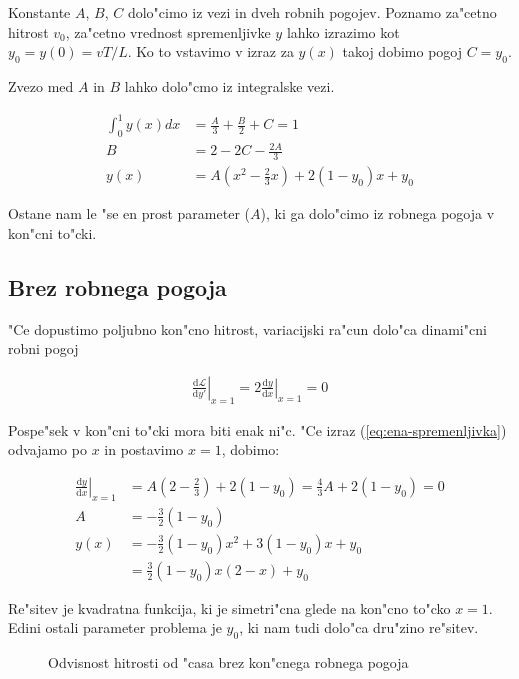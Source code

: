 \documentclass[12pt]{article}
\newcommand{\dd}{\mathrm{d}}
\begin{document}
Konstante $A$, $B$, $C$ dolo"cimo iz vezi in dveh robnih pogojev. Poznamo za"cetno hitrost $v_0$, za"cetno vrednost spremenljivke $y$ lahko izrazimo kot $y_0 = y(0) = v T / L$. Ko to vstavimo v izraz za $y(x)$ takoj dobimo pogoj $C = y_0$. 

Zvezo med $A$ in $B$ lahko dolo"cmo iz integralske vezi. 

\begin{align}
\int_0^1 y(x) dx &= \frac{A}{3} + \frac{B}{2} + C = 1 \\
B &= 2 - 2C - \frac{2A}{3} \\
y(x) &= A(x^2 - \frac{2}{3}x) + 2(1-y_0)x + y_0 \label{eq:ena-spremenljivka}
\end{align}

Ostane nam le "se en prost parameter ($A$), ki ga dolo"cimo iz robnega pogoja v kon"cni to"cki. 

\subsection{Brez robnega pogoja}
"Ce dopustimo poljubno kon"cno hitrost, variacijski ra"cun dolo"ca dinami"cni robni pogoj 

\begin{align}
\left.\frac{\dd \mathcal L}{\dd y'}\right|_{x=1} = 2\left.\frac{\dd y}{\dd x}\right|_{x=1} = 0 
\end{align}

Pospe"sek v kon"cni to"cki mora biti enak ni"c. "Ce izraz (\ref{eq:ena-spremenljivka}) odvajamo po $x$ in postavimo $x=1$, dobimo:

\begin{align}
\left.\frac{\dd y}{\dd x}\right|_{x=1} &= A(2 - \frac{2}{3}) + 2(1-y_0) = \frac{4}{3}A + 2(1-y_0) = 0 \\
A &= -\frac{3}{2}(1-y_0) \\
y(x) &=  -\frac{3}{2}(1-y_0)x^2 + 3(1-y_0)x + y_0 \\
  &= \frac{3}{2}(1-y_0) x (2-x) + y_0 \label{eq:brez-robnega}
\end{align}

Re"sitev je kvadratna funkcija, ki je simetri"cna glede na kon"cno to"cko $x=1$. Edini ostali parameter problema je $y_0$, ki nam tudi dolo"ca dru"zino re"sitev. 

\begin{figure}

\label{fig:brez}
\caption{Odvisnost hitrosti od "casa brez kon"cnega robnega pogoja}
\end{figure}
\end{document}
